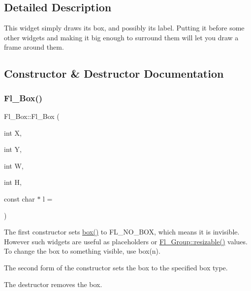 \subsection{Detailed Description}
This widget simply draws its box, and possibly its label. Putting it before some other widgets and making it big enough to surround them will let you draw a frame around them. 

\subsection{Constructor \& Destructor Documentation}
\mbox{\label{class_fl___box_aefe388870c477330fb646b450fd5225c}} 
\subsubsection{\texorpdfstring{Fl\+\_\+\+Box()}{Fl\_Box()}\hspace{0.1cm}{\footnotesize\ttfamily [1/2]}}
{\footnotesize\ttfamily Fl\+\_\+\+Box\+::\+Fl\+\_\+\+Box (\begin{DoxyParamCaption}\item[{int}]{X,  }\item[{int}]{Y,  }\item[{int}]{W,  }\item[{int}]{H,  }\item[{const char $\ast$}]{l = {} }\end{DoxyParamCaption})}


\begin{DoxyItemize}
\item The first constructor sets \hyperlink{class_fl___widget_a9d1f48fbbe4d885e81df38b2a93b614f}{box()} to F\+L\+\_\+\+N\+O\+\_\+\+B\+OX, which means it is invisible. However such widgets are useful as placeholders or \hyperlink{class_fl___group_ab0ed0d1974d7185594687849f386c5f3}{Fl\+\_\+\+Group\+::resizable()} values. To change the box to something visible, use box(n).
\item The second form of the constructor sets the box to the specified box type. 
\end{DoxyItemize}

The destructor removes the box. \mbox{\label{class_fl___box_aadca87f8bab6bdd53090e52300069dfa}} 
